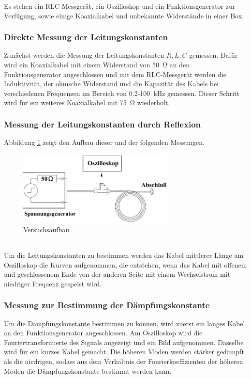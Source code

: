 Es stehen ein RLC-Messgerät, ein Oszilloskop und ein Funktionsgenerator zur Ver\-fü\-gung, sowie einige Koaxialkabel und unbekannte Widerstände in einer Box.
\subsubsection*{Direkte Messung der Leitungskonstanten}
Zunächst werden die Messung der Leitungskonstanten $R,L,C$ gemessen. Dafür wird ein Koaxialkabel mit einem Widerstand von \SI{50}{\ohm} an den Funktionsgenerator angeschlossen und mit dem RLC-Messgerät werden die Induktivität, der ohmsche Widerstand und die Kapazität des Kabels bei verschiedenen Frequenzen im Bereich von 0.2-\SI{100}{\kilo\hertz} gemessen. Dieser Schritt wird für ein weiteres Koaxialkabel mit \SI{75}{\ohm} wiederholt.
\subsubsection*{Messung der Leitungskonstanten durch Reflexion}
Abbildung \ref{fig:Aufbau} zeigt den Aufbau dieser und der folgenden Messungen.
\begin{figure}[h]
	\centering
	\includegraphics[width=0.7\textwidth]{Aufbau.pdf}
	\caption{Versuchsaufbau \cite{E2}}
	\label{fig:Aufbau}
\end{figure} \\
Um die Leitungskonstanten zu bestimmen werden das Kabel mittlerer Länge am Oszilloskop die Kurven aufgenommen, die entstehen, wenn das Kabel mit offenem und geschlossenem Ende von der anderen Seite mit einem Wechselstrom mit niedriger Frequenz gespeist wird.

\subsubsection*{Messung zur Bestimmung der Dämpfungskonstante}
Um die Dämpfungskonstante bestimmen zu können, wird zuerst ein langes Kabel an den Funktionsgenerator angeschlossen. Am Oszilloskop wird die Fouriertransformierte des Signals angezeigt und ein Bild aufgenommen. Dasselbe wird für ein kurzes Kabel gemacht. Die höheren Moden werden stärker gedämpft als die niedrigen, sodass aus dem Verhältnis der Fourierkoeffizienten der höheren Moden die Dämpfungskonstante bestimmt werden kann.
